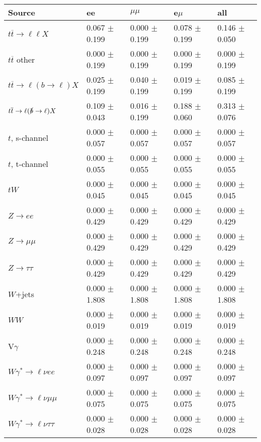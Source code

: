 \begin{tabular}{l | l l l l}
\hline\hline
 Source  &  ee  &  $\mu\mu$  &  e$\mu$  &  all \\
\hline
$t\overline{t}\rightarrow \ell\ell X$ &  0.067 $\pm$  0.199 &  0.000 $\pm$  0.199 &  0.078 $\pm$  0.199 &  0.146 $\pm$  0.050\\
$t\overline{t}$ other &  0.000 $\pm$  0.199 &  0.000 $\pm$  0.199 &  0.000 $\pm$  0.199 &  0.000 $\pm$  0.199\\
$t\overline{t}\rightarrow \ell(b\rightarrow \ell)X$ &  0.025 $\pm$  0.199 &  0.040 $\pm$  0.199 &  0.019 $\pm$  0.199 &  0.085 $\pm$  0.199\\
$t\overline{t}\rightarrow \ell(\slashed{b}\rightarrow \ell)X$ &  0.109 $\pm$  0.043 &  0.016 $\pm$  0.199 &  0.188 $\pm$  0.060 &  0.313 $\pm$  0.076\\
\hline
$t$, s-channel &  0.000 $\pm$  0.057 &  0.000 $\pm$  0.057 &  0.000 $\pm$  0.057 &  0.000 $\pm$  0.057\\
$t$, t-channel &  0.000 $\pm$  0.055 &  0.000 $\pm$  0.055 &  0.000 $\pm$  0.055 &  0.000 $\pm$  0.055\\
$tW$ &  0.000 $\pm$  0.045 &  0.000 $\pm$  0.045 &  0.000 $\pm$  0.045 &  0.000 $\pm$  0.045\\
\hline
$Z\rightarrow ee$ &  0.000 $\pm$  0.429 &  0.000 $\pm$  0.429 &  0.000 $\pm$  0.429 &  0.000 $\pm$  0.429\\
$Z\rightarrow\mu\mu$ &  0.000 $\pm$  0.429 &  0.000 $\pm$  0.429 &  0.000 $\pm$  0.429 &  0.000 $\pm$  0.429\\
$Z\rightarrow\tau\tau$ &  0.000 $\pm$  0.429 &  0.000 $\pm$  0.429 &  0.000 $\pm$  0.429 &  0.000 $\pm$  0.429\\
$W$+jets &  0.000 $\pm$  1.808 &  0.000 $\pm$  1.808 &  0.000 $\pm$  1.808 &  0.000 $\pm$  1.808\\
$WW$ &  0.000 $\pm$  0.019 &  0.000 $\pm$  0.019 &  0.000 $\pm$  0.019 &  0.000 $\pm$  0.019\\
\hline
V$\gamma$ &  0.000 $\pm$  0.248 &  0.000 $\pm$  0.248 &  0.000 $\pm$  0.248 &  0.000 $\pm$  0.248\\
$W\gamma^{*}\rightarrow\ell\nu e e$ &  0.000 $\pm$  0.097 &  0.000 $\pm$  0.097 &  0.000 $\pm$  0.097 &  0.000 $\pm$  0.097\\
$W\gamma^{*}\rightarrow\ell\nu\mu\mu$ &  0.000 $\pm$  0.075 &  0.000 $\pm$  0.075 &  0.000 $\pm$  0.075 &  0.000 $\pm$  0.075\\
$W\gamma^{*}\rightarrow\ell\nu\tau\tau$ &  0.000 $\pm$  0.028 &  0.000 $\pm$  0.028 &  0.000 $\pm$  0.028 &  0.000 $\pm$  0.028\\

\end{tabular}
